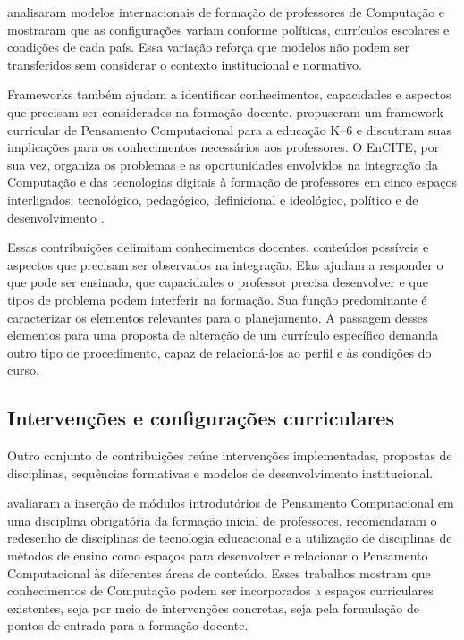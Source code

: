  analisaram modelos internacionais de formação de professores de Computação e mostraram que as configurações variam conforme políticas, currículos escolares e condições de cada país. Essa variação reforça que modelos não podem ser transferidos sem considerar o contexto institucional e normativo.

Frameworks também ajudam a identificar conhecimentos, capacidades e aspectos que precisam ser considerados na formação docente.  propuseram um framework curricular de Pensamento Computacional para a educação K--6 e discutiram suas implicações para os conhecimentos necessários aos professores. O EnCITE, por sua vez, organiza os problemas e as oportunidades envolvidos na integração da Computação e das tecnologias digitais à formação de professores em cinco espaços interligados: tecnológico, pedagógico, definicional e ideológico, político e de desenvolvimento \cite{vogel2024encite}.

Essas contribuições delimitam conhecimentos docentes, conteúdos possíveis e aspectos que precisam ser observados na integração. Elas ajudam a responder o que pode ser ensinado, que capacidades o professor precisa desenvolver e que tipos de problema podem interferir na formação. Sua função predominante é caracterizar os elementos relevantes para o planejamento. A passagem desses elementos para uma proposta de alteração de um currículo específico demanda outro tipo de procedimento, capaz de relacioná-los ao perfil e às condições do curso.

\subsection{Intervenções e configurações curriculares}
\label{subsec:intervencoes-configuracoes-curriculares}

Outro conjunto de contribuições reúne intervenções implementadas, propostas de disciplinas, sequências formativas e modelos de desenvolvimento institucional.

 avaliaram a inserção de módulos introdutórios de Pensamento Computacional em uma disciplina obrigatória da formação inicial de professores.  recomendaram o redesenho de disciplinas de tecnologia educacional e a utilização de disciplinas de métodos de ensino como espaços para desenvolver e relacionar o Pensamento Computacional às diferentes áreas de conteúdo. Esses trabalhos mostram que conhecimentos de Computação podem ser incorporados a espaços curriculares existentes, seja por meio de intervenções concretas, seja pela formulação de pontos de entrada para a formação docente.

